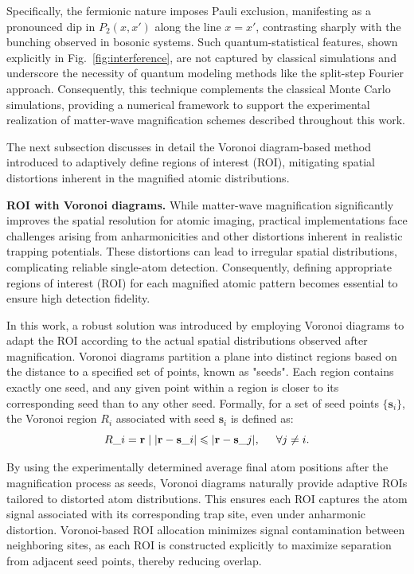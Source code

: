 Specifically, the fermionic nature imposes Pauli exclusion, manifesting as a pronounced dip in $P_2(x,x')$ along the line $x=x'$, contrasting sharply with the bunching observed in bosonic systems. Such quantum-statistical features, shown explicitly in Fig.~\ref{fig:interference}, are not captured by classical simulations and underscore the necessity of quantum modeling methods like the split-step Fourier approach. Consequently, this technique complements the classical Monte Carlo simulations, providing a numerical framework to support the experimental realization of matter-wave magnification schemes described throughout this work.

The next subsection discusses in detail the Voronoi diagram-based method introduced to adaptively define regions of interest (ROI), mitigating spatial distortions inherent in the magnified atomic distributions.


\textbf{ROI with Voronoi diagrams.}
While matter-wave magnification significantly improves the spatial resolution for atomic imaging, practical implementations face challenges arising from anharmonicities and other distortions inherent in realistic trapping potentials. These distortions can lead to irregular spatial distributions, complicating reliable single-atom detection. Consequently, defining appropriate regions of interest (ROI) for each magnified atomic pattern becomes essential to ensure high detection fidelity.

In this work, a robust solution was introduced by employing Voronoi diagrams to adapt the ROI according to the actual spatial distributions observed after magnification. Voronoi diagrams partition a plane into distinct regions based on the distance to a specified set of points, known as "seeds". Each region contains exactly one seed, and any given point within a region is closer to its corresponding seed than to any other seed. Formally, for a set of seed points $\{\mathbf{s}_i\}$, the Voronoi region $R_i$ associated with seed $\mathbf{s}_i$ is defined as:
\begin{equation}
R\_i = {\mathbf{r} \mid |\mathbf{r}-\mathbf{s}\_i| \leq |\mathbf{r}-\mathbf{s}\_j|, \hspace{5 mm} \forall j \neq i}.
\end{equation}

By using the experimentally determined average final atom positions after the magnification process as seeds, Voronoi diagrams naturally provide adaptive ROIs tailored to distorted atom distributions. This ensures each ROI captures the atom signal associated with its corresponding trap site, even under anharmonic distortion. Voronoi-based ROI allocation minimizes signal contamination between neighboring sites, as each ROI is constructed explicitly to maximize separation from adjacent seed points, thereby reducing overlap.

